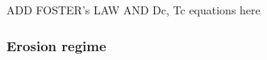 \documentclass[gmd, manuscript]{copernicus}
\begin{document}
ADD FOSTER's LAW AND Dc, Tc equations here




\subsubsection{Erosion regime}


\end{document}
